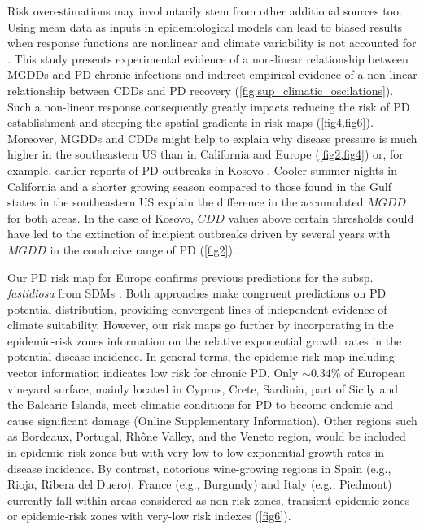     Risk overestimations may involuntarily stem from other additional sources
    too.
    Using mean data as inputs in epidemiological models can lead to biased
    results
    when response functions are nonlinear and climate variability is not
    accounted
    for \cite{Scherm1994}. This study presents experimental evidence of a
    non-linear relationship between MGDDs and PD chronic infections and
    indirect
    empirical evidence of a non-linear relationship between CDDs and PD
    recovery
    (\cref{fig:sup_climatic_oscilations}). Such a non-linear response
    consequently
    greatly impacts reducing the risk of PD establishment and steeping the
    spatial
    gradients in risk maps (\cref{fig4,fig6}). Moreover, MGDDs and CDDs might
    help
    to explain why disease pressure is much higher in the southeastern US than
    in
    California and Europe (\cref{fig2,fig4}) or, for example, earlier reports
    of PD
    outbreaks in Kosovo  \cite{Berisha1998}. Cooler summer nights in California
    and
    a shorter growing season compared to those found in the Gulf states in the
    southeastern US explain the difference in the accumulated $MGDD$ for both
    areas. In the case of Kosovo, $CDD$ values above certain thresholds could
    have
    led to the extinction of incipient outbreaks driven by several years with
$MGDD$ in the conducive range of PD (\cref{fig2}).

    Our PD risk map for Europe confirms previous predictions for the subsp.
    \textit{fastidiosa} from SDMs \cite{Bragard2019}. Both approaches make
    congruent predictions on PD potential distribution, providing convergent
    lines
    of independent evidence of climate suitability. However, our risk maps go
    further by incorporating in the epidemic-risk zones information on the
    relative
    exponential growth rates in the potential disease incidence. In general
    terms,
    the epidemic-risk map including vector information indicates low risk for
    chronic PD. Only $\sim 0.34\%$ of European vineyard surface, mainly located
    in
    Cyprus, Crete, Sardinia, part of Sicily and the Balearic Islands, meet
    climatic
    conditions for PD to become endemic and cause significant damage
    (Online Supplementary Information). Other regions such as Bordeaux,
    Portugal, Rh\^one Valley, and the Veneto region, would be included in
    epidemic-risk zones but with very low to low exponential growth rates in
    disease incidence. By contrast, notorious wine-growing regions in Spain
    (e.g.,
    Rioja, Ribera del Duero), France (e.g., Burgundy) and Italy (e.g.,
    Piedmont)
    currently fall within areas considered as non-risk zones,
    transient-epidemic
    zones or epidemic-risk zones with very-low risk indexes (\cref{fig6}).

